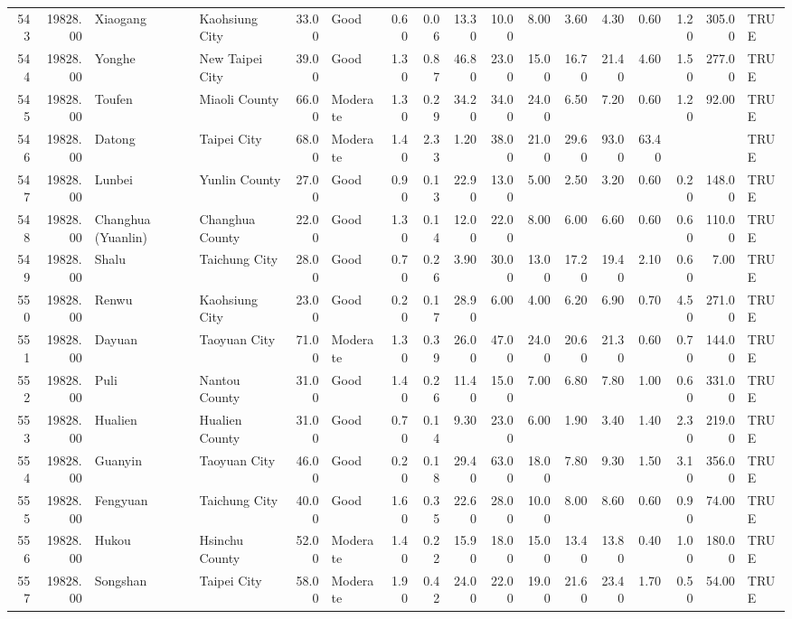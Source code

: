 \begin{table}[ht]
\begin{tabular}{rrllrlrrrrrrrrrrl}
  543 & 19828.00 & Xiaogang & Kaohsiung City & 33.00 & Good & 0.60 & 0.06 & 13.30 & 10.00 & 8.00 & 3.60 & 4.30 & 0.60 & 1.20 & 305.00 & TRUE \\ 
  544 & 19828.00 & Yonghe & New Taipei City & 39.00 & Good & 1.30 & 0.87 & 46.80 & 23.00 & 15.00 & 16.70 & 21.40 & 4.60 & 1.50 & 277.00 & TRUE \\ 
  545 & 19828.00 & Toufen & Miaoli County & 66.00 & Moderate & 1.30 & 0.29 & 34.20 & 34.00 & 24.00 & 6.50 & 7.20 & 0.60 & 1.20 & 92.00 & TRUE \\ 
  546 & 19828.00 & Datong & Taipei City & 68.00 & Moderate & 1.40 & 2.33 & 1.20 & 38.00 & 21.00 & 29.60 & 93.00 & 63.40 &  &  & TRUE \\ 
  547 & 19828.00 & Lunbei & Yunlin County & 27.00 & Good & 0.90 & 0.13 & 22.90 & 13.00 & 5.00 & 2.50 & 3.20 & 0.60 & 0.20 & 148.00 & TRUE \\ 
  548 & 19828.00 & Changhua (Yuanlin) & Changhua County & 22.00 & Good & 1.30 & 0.14 & 12.00 & 22.00 & 8.00 & 6.00 & 6.60 & 0.60 & 0.60 & 110.00 & TRUE \\ 
  549 & 19828.00 & Shalu & Taichung City & 28.00 & Good & 0.70 & 0.26 & 3.90 & 30.00 & 13.00 & 17.20 & 19.40 & 2.10 & 0.60 & 7.00 & TRUE \\ 
  550 & 19828.00 & Renwu & Kaohsiung City & 23.00 & Good & 0.20 & 0.17 & 28.90 & 6.00 & 4.00 & 6.20 & 6.90 & 0.70 & 4.50 & 271.00 & TRUE \\ 
  551 & 19828.00 & Dayuan & Taoyuan City & 71.00 & Moderate & 1.30 & 0.39 & 26.00 & 47.00 & 24.00 & 20.60 & 21.30 & 0.60 & 0.70 & 144.00 & TRUE \\ 
  552 & 19828.00 & Puli & Nantou County & 31.00 & Good & 1.40 & 0.26 & 11.40 & 15.00 & 7.00 & 6.80 & 7.80 & 1.00 & 0.60 & 331.00 & TRUE \\ 
  553 & 19828.00 & Hualien & Hualien County & 31.00 & Good & 0.70 & 0.14 & 9.30 & 23.00 & 6.00 & 1.90 & 3.40 & 1.40 & 2.30 & 219.00 & TRUE \\ 
  554 & 19828.00 & Guanyin & Taoyuan City & 46.00 & Good & 0.20 & 0.18 & 29.40 & 63.00 & 18.00 & 7.80 & 9.30 & 1.50 & 3.10 & 356.00 & TRUE \\ 
  555 & 19828.00 & Fengyuan & Taichung City & 40.00 & Good & 1.60 & 0.35 & 22.60 & 28.00 & 10.00 & 8.00 & 8.60 & 0.60 & 0.90 & 74.00 & TRUE \\ 
  556 & 19828.00 & Hukou & Hsinchu County & 52.00 & Moderate & 1.40 & 0.22 & 15.90 & 18.00 & 15.00 & 13.40 & 13.80 & 0.40 & 1.00 & 180.00 & TRUE \\ 
  557 & 19828.00 & Songshan & Taipei City & 58.00 & Moderate & 1.90 & 0.42 & 24.00 & 22.00 & 19.00 & 21.60 & 23.40 & 1.70 & 0.50 & 54.00 & TRUE \\ 

\end{tabular}
\end{table}
